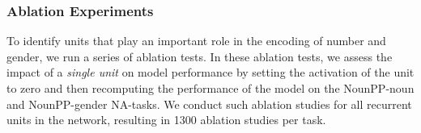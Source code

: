 \subsubsection{Ablation Experiments}
To identify units that play an important role in the encoding of number and gender, we run a series of ablation tests.
In these ablation tests, we assess the impact of a \emph{single unit} on model performance by setting the activation of the unit to zero and then recomputing the performance of the model on the NounPP-noun and NounPP-gender NA-tasks. 
We conduct such ablation studies for all recurrent units in the network, resulting in 1300 ablation studies per task.
